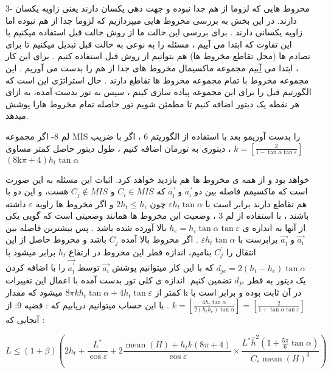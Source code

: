 \documentclass[12pt]{book}
\begin{document}
3-
مخروط هایی که لزوما از هم جدا نبوده و جهت دهی یکسان دارند یعنی زاویه یکسان دارند.
در این بخش به بررسی مخروط هایی میپردازیم که لزوما جدا از هم نبوده اما زاویه یکسانی دارند . برای بررسی این حالت ما از روش حالت قبل استفاده میکنیم با این تفاوت که ابتدا می آییم ، مسئله را به نوعی به حالت قبل تبدیل میکنیم تا برای تصادم ها (محل تقاطع مخروط ها) هم بتوانیم از روش قبل استفاده کنیم . برای این کار ، ابتدا می آِییم مجموعه ماکسیمال مخروط های جدا از هم را بدست می آوریم . این مجموعه مخروط با تمام مجموعه مخروط ها تقاطع دارند . حال استراتژی این است که الگورتیم قبل را برای این مجموعه پیاده سازی کینم ، سپس به تور بدست آمده، به ازای هر نقطه یک دیتور  اضافه کنیم تا مطمئن شویم تور حاصله تمام مخروط هارا پوشش میدهد.

لم 8- اگر مجموعه
 MIS
 را بدست آوریمو بعد با استفاده از الگوریتم 6 ، اگر با ضریب
$k=\left[\frac{2}{1-\tan \alpha \tan \varepsilon}\right]$
، دیتوری به تورمان اضافه کنیم ، طول دیتور حاصل کمتر مساوی 
$(8 \mathrm{k} \pi+4) h_{t} \tan \alpha$

خواهد بود و از همه ی مخروط ها هم بازدید خواهد کرد. اثبات این مسئله به این صورت است که ماکسیمم فاصله بین دو 
$\overrightarrow{a_{\imath}}$
و
$\overrightarrow{a_{\jmath}}$
که 
$C_{i} \in M I S$
و 
$C_{j} \notin M I S$
هست، و این دو با هم تقاطع دارند برابر است با
$\varepsilon h_{t} \tan \alpha$
چون 
$2 h_{t} \leq h_{i}$
و اگر مخروط ها زاویه 
$\varepsilon$
داشته باشند ، با استفاده از لم 3 ، وضعیت این مخروط ها همانند وضعیتی است که گویی یکی از آنها به اندازه ی 
$h_{e}=h_{i} \tan \alpha \tan \varepsilon$
بالا آورده شده باشد . پس بیشترین فاصله بین 
$\overrightarrow{a_{\imath}}$
و 
$\overrightarrow{a_{\jmath}}$
برابرست با 
$\varepsilon h_{t} \tan \alpha$
.
اگر مخروط بالا آمده 
$C_{j} $
باشد و مخروط حاصل از این انتقال را 
$C_{j}^{\prime}$
بنامیم، اندازه قطر این مخروط در ارتفاع
$h_{t} $
برابر میشود با 
$d_{j e}=2\left(h_{t}-h_{e}\right) \tan \alpha$
که با این کار میتوانیم پوشش 
$\overrightarrow{a_{\imath}}$
توسط
$\overrightarrow{a_{\jmath}^{\prime}}$
را با اضافه کردن یک دیتور به قطر
$d_{j e}$
تضمین کنیم. اندازه ی کلی تور بدست آمده با اعمال این تغییرات کمتر از
$8 \pi k h_{t} \tan \alpha+4 h_{t} \tan \varepsilon$
میشود که مقدار
 k 
در آن ثابت بوده و برابر است با
$k=\left[\frac{4 h_{t} \tan \alpha}{2\left(h_{t} h_{e}\right) \tan \alpha}\right]=\left[\frac{2}{1+\tan \alpha \tan \varepsilon}\right]$
. با این حساب میتوانیم دریابیم که :
قضیه 9:
از آنجایی که :

\begin{equation}
L \leq(1+\beta)\left(2 h_{t}+\frac{L^{*}}{\cos \varepsilon}+2 \frac{\operatorname{mean}(H)+h_{t} k(8 \pi+4)}{\cos \varepsilon} \times \frac{L^{*} \hat{h}^{2}\left(1+\frac{5 \pi}{6} \tan \alpha\right)}{C_{\varepsilon} \operatorname{mean}(H)^{3}}\right)
\end{equation}
\end{document}
